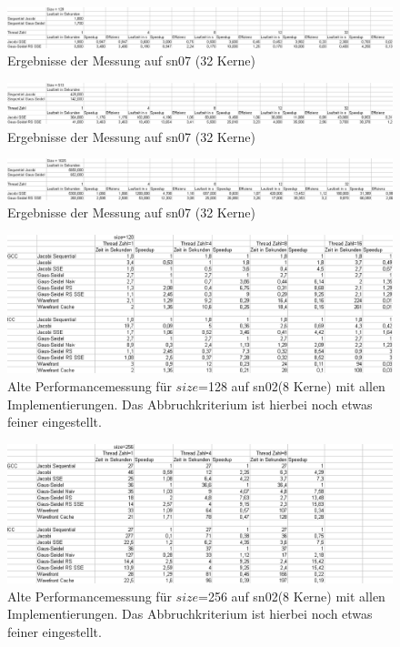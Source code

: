\documentclass{article}
\begin{document}
\begin{figure}[h] 
  \centering
     \includegraphics[width=1.2\textwidth]{bilder/sn7129.png}
  \caption{Ergebnisse der Messung auf sn07 (32 Kerne)}
\end{figure}
\begin{figure}[h] 
  \centering
     \includegraphics[width=1.2\textwidth]{bilder/sn7513.png}
  \caption{Ergebnisse der Messung auf sn07 (32 Kerne)}
\end{figure}
\begin{figure}[h] 
  \centering
     \includegraphics[width=1.2\textwidth]{bilder/sn71025.png}
  \caption{Ergebnisse der Messung auf sn07 (32 Kerne)}
\end{figure}



\begin{figure}[h] 
  \centering
     \includegraphics[width=1.0\textwidth]{bilder/sn02128.png}
  \caption{Alte Performancemessung für $size$=128 auf sn02(8 Kerne) mit allen Implementierungen. Das Abbruchkriterium ist hierbei noch etwas feiner eingestellt.}
 
\end{figure}
\begin{figure}[h] 
  \centering
     \includegraphics[width=1.0\textwidth]{bilder/sn02256.png}
  \caption{Alte Performancemessung für $size$=256 auf sn02(8 Kerne) mit allen Implementierungen. Das Abbruchkriterium ist hierbei noch etwas feiner eingestellt.}
 
\end{figure}
\end{document}
